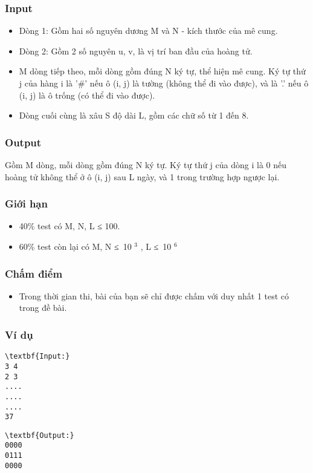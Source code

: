 \subsubsection{Input}
\begin{itemize}
	\item Dòng 1: Gồm hai số nguyên dương M và N - kích thước của mê cung.
	\item Dòng 2: Gồm 2 số nguyên u, v, là vị trí ban đầu của hoàng tử.
	\item M dòng tiếp theo, mỗi dòng gồm đúng N ký tự, thể hiện mê cung. Ký tự thứ j của hàng i là '\#' nếu ô (i, j) là tường (không thể đi vào được), và là '.' nếu ô (i, j) là ô trống (có thể đi vào được).
	\item Dòng cuối cùng là xâu S độ dài L, gồm các chữ số từ 1 đến 8.
\end{itemize}

\subsubsection{Output}

Gồm M dòng, mỗi dòng gồm đúng N ký tự. Ký tự thứ j của dòng i là 0 nếu hoàng tử không thể ở ô (i, j) sau L ngày, và 1 trong trường hợp ngược lại.

\subsubsection{Giới hạn}
\begin{itemize}
	\item 40\% test có M, N, L ≤ 100.
	\item 60\% test còn lại có M, N ≤ 10 $^ 3 $ , L ≤ 10 $^ 6 $
\end{itemize}

\subsubsection{Chấm điểm}
\begin{itemize}
	\item Trong thời gian thi, bài của bạn sẽ chỉ được chấm với duy nhất 1 test có trong đề bài.
\end{itemize}

\subsubsection{Ví dụ}
\begin{verbatim}
\textbf{Input:}
3 4
2 3
....
....
....
37\end{verbatim}
\begin{verbatim}
\textbf{Output:}
0000
0111
0000
\end{verbatim}
